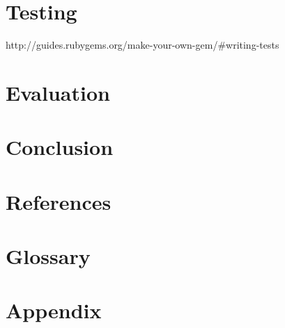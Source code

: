 \documentclass{article}
\begin{document}
\newpage


\newpage
\section{Testing}

http://guides.rubygems.org/make-your-own-gem/#writing-tests

\newpage
\section{Evaluation}

\newpage
\section{Conclusion}

\newpage
\section{References}

\renewcommand{\bibname}{}

\newpage
\section{Glossary}
\printglossary
\newpage
\section{Appendix}
\end{document}
